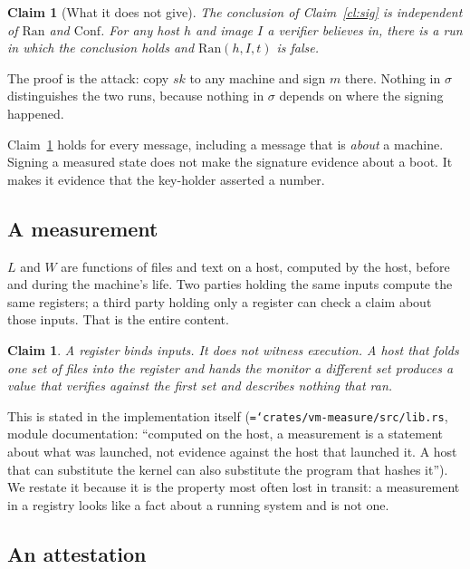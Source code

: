 \documentclass[11pt,a4paper]{article}
\newtheorem{claim}[definition]{Claim}
\newcommand{\code}[1]{\texttt{\hyphenchar\font=`\-\relax #1}}
\newcommand{\Ran}{\mathrm{Ran}}
\newcommand{\Conf}{\mathrm{Conf}}
\begin{document}
\begin{claim}[What it does not give]\label{cl:indep}
The conclusion of Claim~\ref{cl:sig} is independent of $\Ran$ and $\Conf$. For
any host $h$ and image $I$ a verifier believes in, there is a run in which the
conclusion holds and $\Ran(h, I, t)$ is false.
\end{claim}

\noindent The proof is the attack: copy $sk$ to any machine and sign $m$ there.
Nothing in $\sigma$ distinguishes the two runs, because nothing in $\sigma$
depends on where the signing happened.

Claim~\ref{cl:indep} holds for every message, including a message that is
\emph{about} a machine. Signing a measured state does not make the signature
evidence about a boot. It makes it evidence that the key-holder asserted a
number.

\subsection{A measurement}

$L$ and $W$ are functions of files and text on a host, computed by the host,
before and during the machine's life. Two parties holding the same inputs compute
the same registers; a third party holding only a register can check a claim about
those inputs. That is the entire content.

\begin{claim}\label{cl:meas}
A register binds inputs. It does not witness execution. A host that folds one set
of files into the register and hands the monitor a different set produces a value
that verifies against the first set and describes nothing that ran.
\end{claim}

This is stated in the implementation itself (\code{crates/vm-measure/src/lib.rs},
module documentation: ``computed on the host, a measurement is a statement about
what was launched, not evidence against the host that launched it. A host that
can substitute the kernel can also substitute the program that hashes it''). We
restate it because it is the property most often lost in transit: a measurement
in a registry looks like a fact about a running system and is not one.

\subsection{An attestation}
\label{sec:att}
\end{document}
